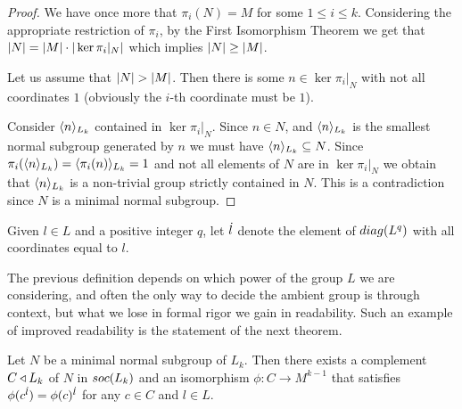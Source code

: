 \begin{proof}
    We have once more that $\pi_i(N) = M$ for some $1 \le i \le k$. Considering the appropriate restriction of $\pi_i$, by the First Isomorphism Theorem we get that $| N | = | M | \cdot | \ker{\pi_i|_{N}} |$ which implies $| N | \geq | M |$.

    Let us assume that $| N | > | M |$. Then there is some $n \in \ker{\pi_i|_{N}}$ with not all coordinates $1$ (obviously the $i$-th coordinate must be $1$).

    Consider $\langle n \rangle_{L_k}$ contained in $\ker{\pi_i|_{N}}$. Since $n \in N$, and $\langle n \rangle_{L_k}$ is the smallest normal subgroup generated by $n$ we must have $\langle n \rangle_{L_k} \subseteq N$. Since $\pi_i(\langle n \rangle_{L_k}) = \langle \pi_i(n) \rangle_{L_k} = 1$ and not all elements of $N$ are in $\ker{\pi_i|_{N}}$ we obtain that $\langle n \rangle_{L_k}$ is a non-trivial group strictly contained in $N$. This is a contradiction since $N$ is a minimal normal subgroup.
\end{proof}

\begin{definition}
    Given $l \in L$ and a positive integer $q$, let $\dot{l}$ denote the element of $diag({L^q})$ with all coordinates equal to $l$.
\end{definition}

The previous definition depends on which power of the group $L$ we are considering, and often the only way to decide the ambient group is through context, but what we lose in formal rigor we gain in readability. Such an example of improved readability is the statement of the next theorem.

\begin{theorem}
    \label{cplNsoc}
    Let $N$ be a minimal normal subgroup of $L_k$. Then there exists a complement $C \triangleleft L_k$ of $N$ in $soc {(L_k)}$ and an isomorphism $\phi \colon C \rightarrow M^{k-1}$ that satisfies $\phi(c^{\dot{l}}) = \phi(c)^{\dot{l}}$ for any $c \in C$ and $l \in L$.
\end{theorem}

